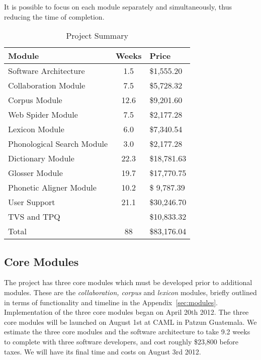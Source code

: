 \documentclass[12 pt]{article}
\begin{document}
It is possible to focus on each module separately and simultaneously, thus reducing the time of completion. 



\begin{table}[htbp]
\begin{center}
  \begin{tabular}{ | lcl | }
\hline
    Module & Weeks & Price\\ 
\hline
    Software Architecture & 1.5  & \$1,555.20  \\ 
    Collaboration Module & 7.5  & \$5,728.32  \\ 
    Corpus Module & 12.6 & \$9,201.60 \\
     Web Spider Module  & 7.5 & \$2,177.28\\
      Lexicon Module & 6.0 & \$7,340.54 \\ 
     Phonological Search Module & 3.0 & \$2,177.28 \\
    Dictionary Module & 22.3 & \$18,781.63 \\
        Glosser Module & 19.7 & \$17,770.75 \\
Phonetic Aligner Module & 10.2 & \$ 9,787.39\\ 
User Support & 21.1 & \$30,246.70 \\
TVS and TPQ &  & \$10,833.32 \\
Total &  88 &\$83,176.04\\

\hline
  \end{tabular}
  \caption{Project Summary}
  \label{tab:label}
  \end{center}
\end{table}


\subsection{Core Modules}

The project has three core modules which must be developed prior to additional modules. These are the {\it collaboration, corpus} and {\it lexicon} modules, briefly outlined in terms of functionality and timeline in the Appendix~\ref{sec:modules}.  Implementation of the three core modules began on April 20th 2012. The three core modules will be launched on August 1st at CAML in Patzun Guatemala. We estimate the three core modules and the software architecture to take 9.2 weeks to complete with three software developers,  and cost roughly \$23,800 before taxes. We will have its final time and costs on August 3rd 2012.
\end{document}
